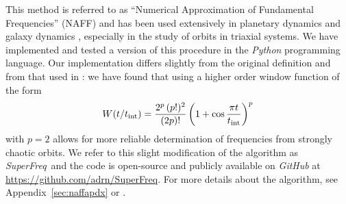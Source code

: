 \documentclass[letterpaper,12pt,preprint]{aastex}
\newcommand{\inttime}{t_{\rm int}}
\newcommand{\project}[1]{\textsl{#1}}
\newcommand{\superfreq}{\project{SuperFreq}}
\begin{document}
This method is referred to as ``Numerical Approximation of Fundamental Frequencies'' (NAFF) and has been used extensively in planetary dynamics \citep[e.g.,][]{laskar93b, laskar96} and galaxy dynamics \citep{papaphilippou98, valluri98}, especially in the study of orbits in triaxial systems. We have implemented and tested a version of this procedure in the \project{Python} programming language. Our implementation differs slightly from the original definition and from that used in \cite{valluri98}: we have found that using a higher order window function \citep[e.g.,][]{hunter02} of the form
\begin{equation}
	W(t/\inttime) = \frac{2^p \, (p!)^2}{(2p)!} \left( 1 + \cos \frac{\pi t}{\inttime}\right)^p
\end{equation}
with $p=2$ allows for more reliable determination of frequencies from strongly chaotic orbits. We refer to this slight modification of the algorithm as \superfreq\ and the code is open-source and publicly available on \project{GitHub} at \url{https://github.com/adrn/SuperFreq}. For more details about the algorithm, see Appendix~\ref{sec:naffapdx} or \cite{laskar88, laskar93, papaphilippou96}.
\end{document}

